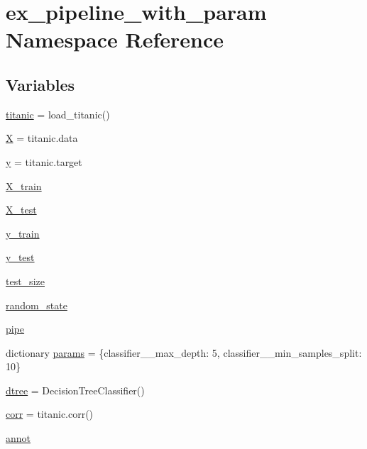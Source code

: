 \hypertarget{namespaceex__pipeline__with__param}{}\section{ex\+\_\+pipeline\+\_\+with\+\_\+param Namespace Reference}
\label{namespaceex__pipeline__with__param}
\subsection*{Variables}
\begin{DoxyCompactItemize}
\item 
\hyperlink{namespaceex__pipeline__with__param_a8fa162f174ccbe88cde0ae4f56929f6c}{titanic} = load\+\_\+titanic()
\item 
\hyperlink{namespaceex__pipeline__with__param_a7de98dcd71f72619064ad930ed9ecf2e}{X} = titanic.\+data
\item 
\hyperlink{namespaceex__pipeline__with__param_a55d876011598ba1017a50347fbf59428}{y} = titanic.\+target
\item 
\hyperlink{namespaceex__pipeline__with__param_a508a6689396096d6f3cfc157743f48bc}{X\+\_\+train}
\item 
\hyperlink{namespaceex__pipeline__with__param_a7b3b1975ee37712aab9eeb70aa3ecb3c}{X\+\_\+test}
\item 
\hyperlink{namespaceex__pipeline__with__param_a1a2e4f22ff1e29e7e37e268790d6a83b}{y\+\_\+train}
\item 
\hyperlink{namespaceex__pipeline__with__param_aef64ec349bb15fc7102dc829c563f3c2}{y\+\_\+test}
\item 
\hyperlink{namespaceex__pipeline__with__param_aee30ac28ee681f9131733b862f8b2261}{test\+\_\+size}
\item 
\hyperlink{namespaceex__pipeline__with__param_ab555404c7856275c7cfc10fa81701560}{random\+\_\+state}
\item 
\hyperlink{namespaceex__pipeline__with__param_acbefc2cf1aaeff6a8bac9d486f2e20d5}{pipe}
\item 
dictionary \hyperlink{namespaceex__pipeline__with__param_a2516b211a5f4e26001fcd0592c73590d}{params} = \{\textquotesingle{}classifier\+\_\+\+\_\+max\+\_\+depth\textquotesingle{}\+: 5, \textquotesingle{}classifier\+\_\+\+\_\+min\+\_\+samples\+\_\+split\textquotesingle{}\+: 10\}
\item 
\hyperlink{namespaceex__pipeline__with__param_a9848f8c9203a67fc457a6220827e4916}{dtree} = Decision\+Tree\+Classifier()
\item 
\hyperlink{namespaceex__pipeline__with__param_a023e948f87c4d7ce264150124c637e55}{corr} = titanic.\+corr()
\item 
\hyperlink{namespaceex__pipeline__with__param_a96893bef2ec5caac8647d209c2fe7e11}{annot}
\end{DoxyCompactItemize}



